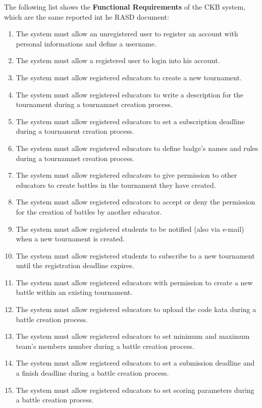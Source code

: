 \documentclass[a4paper, 11pt, titlepage]{article}
\begin{document}
The following list shows the \textbf{Functional Requirements} of the CKB system, which are the same reported int he RASD document:
\begin{enumerate}[font={\bfseries}, label={R\arabic* :}]
    \item The system must allow an unregistered user to register an account with personal informations and define a username.
    \item The system must allow a registered user to login into his account.
    \item The system must allow registered educators to create a new tournament.
    \item The system must allow registered educators to write a description for the tournament during a tournamnet creation process.
    \item The system must allow registered educators to set a subscription deadline during a tournament creation process. 
    \item The system must allow registered educators to define badge's names and rules during a tournamnet creation process.
    \item The system must allow registered educators to give permission to other educators to create battles in the tournament they have created.
    \item The system must allow registered educators to accept or deny the permission for the creation of battles by another educator.
    \item The system must allow registered students to be notified (also via e-mail) when a new tournament is created.
    \item The system must allow registered students to subscribe to a new tournament until the registration deadline expires.
    \item The system must allow registered educators with permission to create a new battle within an existing tournament.
    \item The system must allow registered educators to upload the code kata during a battle creation process.
    \item The system must allow registered educators to set minimum and maximum team's members number during a battle creation process.
    \item The system must allow registered educators to set a submission deadline and a finish deadline during a battle creation process.
    \item The system must allow registered educators to set scoring parameters during a battle creation process.

\end{enumerate}
\end{document}

